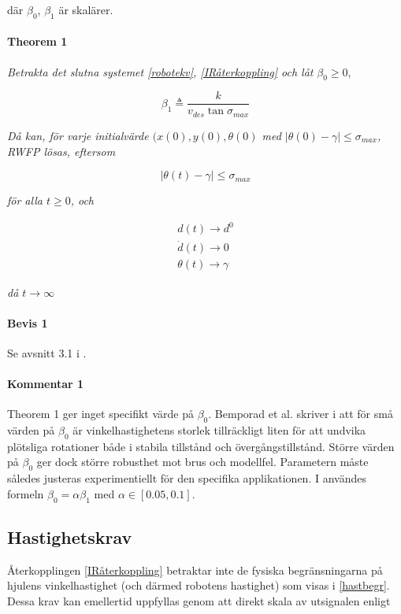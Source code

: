 \documentclass[11pt]{article}
\begin{document}
\begin{flushleft}
där $\beta_0$, $\beta_1$ är skalärer.
	
\paragraph{Theorem 1} \textit{Betrakta det slutna systemet \eqref{robotekv}, \eqref{IRåterkoppling} och låt} $\beta_0 \geq 0$,

\begin{equation}
	\beta_1 \triangleq \frac {k} {v_{des} \tan \sigma_{max}}
\end{equation}

\textit{Då kan, för varje initialvärde $(x(0), y(0), \theta(0)$ med $| \theta(0) - \gamma| \leq \sigma_{max}$,  RWFP lösas, eftersom}

\begin{equation}
	| \theta(t) - \gamma| \leq \sigma_{max}
\end{equation}

\textit{för alla $t \geq 0$, och}

\begin{equation}
\begin{aligned}
	d(t) \to d^0 \\
	\dot{d}(t) \to 0 \\ 
	\theta(t) \to \gamma 
\end{aligned}
\end{equation}

\textit{då $t \to \infty$}

\paragraph{Bevis 1} Se avsnitt 3.1 i \cite{wfp}.

\paragraph{Kommentar 1} Theorem 1 ger inget specifikt värde på $\beta_0$. Bemporad et al. skriver i \cite{wfp} att för små värden på $\beta_0$ är vinkelhastighetens storlek tillräckligt liten för att undvika plötsliga rotationer både i stabila tillstånd och övergångstillstånd. Större värden på $\beta_0$ ger dock större robusthet mot brus och modellfel. Parametern måste således justeras experimentiellt för den specifika applikationen. I \cite{wfp} användes formeln $\beta_0 = \alpha \beta_1$ med $\alpha \in [0.05,0.1]$.

\subsection{Hastighetskrav}
Återkopplingen \eqref{IRåterkoppling} betraktar inte de fysiska begränsningarna på hjulens vinkelhastighet (och därmed robotens hastighet) som visas i \eqref{hastbegr}. Dessa krav kan emellertid uppfyllas genom att direkt skala av utsignalen enligt


\end{flushleft}
\end{document}
